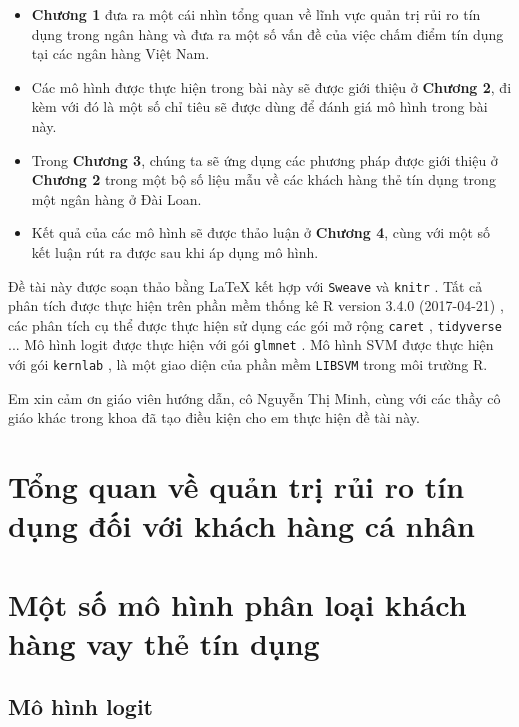\documentclass[a4paper]{report}\usepackage[]{graphicx}\usepackage[]{color}
\begin{document}
\begin{itemize}
\item \textbf{Chương 1} đưa ra một cái nhìn tổng quan về lĩnh vực quản trị rủi ro tín dụng trong ngân hàng và đưa ra một số vấn đề của việc chấm điểm tín dụng tại các ngân hàng Việt Nam.
\item Các mô hình được thực hiện trong bài này sẽ được giới thiệu ở \textbf{Chương 2}, đi kèm với đó là một số chỉ tiêu sẽ được dùng để đánh giá mô hình trong bài này.
\item Trong \textbf{Chương 3}, chúng ta sẽ ứng dụng các phương pháp được giới thiệu ở \textbf{Chương 2} trong một bộ số liệu mẫu về các khách hàng thẻ tín dụng trong một ngân hàng ở Đài Loan.
\item Kết quả của các mô hình sẽ được thảo luận ở \textbf{Chương 4}, cùng với một số kết luận rút ra được sau khi áp dụng mô hình.
\end{itemize}

Đề tài này được soạn thảo bằng \LaTeX{} kết hợp với \texttt{Sweave} và \texttt{knitr} 
\parencite{r:knitr}. Tất cả phân tích được thực hiện trên phần mềm thống kê 
R version 3.4.0 (2017-04-21) \parencite{r:rbase},  
các phân tích cụ thể được thực hiện sử dụng các gói mở rộng \texttt{caret} \parencite{r:caret}, \texttt{tidyverse} \parencite{r:tidyverse}... Mô hình logit được thực hiện với gói \texttt{glmnet} \parencite{r:glmnet}. 
Mô hình SVM được thực hiện với gói \texttt{kernlab} \parencite{r:kernlab}, là một giao diện của phần mềm \texttt{LIBSVM} \parencite{CC01a} trong môi trường R.

Em xin cảm ơn giáo viên hướng dẫn, cô Nguyễn Thị Minh, cùng với các thầy cô giáo khác trong khoa đã tạo điều kiện cho em thực hiện đề tài này.


\chapter{Tổng quan về quản trị rủi ro tín dụng đối với khách hàng cá nhân}



\chapter{Một số mô hình phân loại khách hàng vay thẻ tín dụng}

\section{Mô hình logit}
\end{document}
